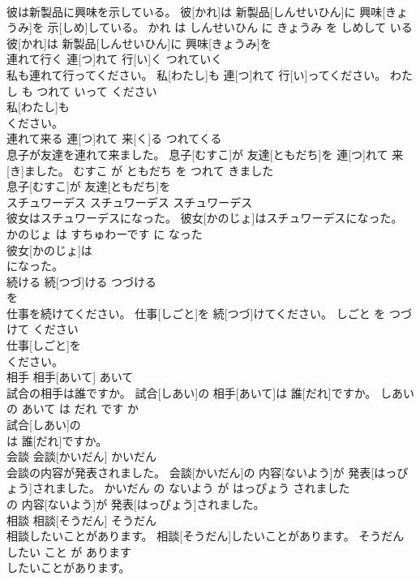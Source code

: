 \documentclass[8pt]{extreport}
\begin{document}
\begin{CJK}{UTF8}{min}
\\	彼は新製品に興味を示している。	彼[かれ]は 新製品[しんせいひん]に 興味[きょうみ]を 示[しめ]している。	かれ は しんせいひん に きょうみ を しめして いる	
\\	彼[かれ]は 新製品[しんせいひん]に 興味[きょうみ]を
\\	連れて行く	連[つ]れて 行[い]く	つれていく	
\\	私も連れて行ってください。	私[わたし]も 連[つ]れて 行[い]ってください。	わたし も つれて いって ください	
\\	私[わたし]も
\\	ください。		
\\	連れて来る	連[つ]れて 来[く]る	つれてくる	
\\	息子が友達を連れて来ました。	息子[むすこ]が 友達[ともだち]を 連[つ]れて 来[き]ました。	むすこ が ともだち を つれて きました	
\\	息子[むすこ]が 友達[ともだち]を
\\	スチュワーデス	スチュワーデス	スチュワーデス	
\\	彼女はスチュワーデスになった。	彼女[かのじょ]はスチュワーデスになった。	かのじょ は すちゅわーです に なった	
\\	彼女[かのじょ]は
\\	になった。		
\\	続ける	続[つづ]ける	つづける	
\\	を		
\\	仕事を続けてください。	仕事[しごと]を 続[つづ]けてください。	しごと を つづけて ください	
\\	仕事[しごと]を
\\	ください。		
\\	相手	相手[あいて]	あいて	
\\	試合の相手は誰ですか。	試合[しあい]の 相手[あいて]は 誰[だれ]ですか。	しあい の あいて は だれ です か	
\\	試合[しあい]の
\\	は 誰[だれ]ですか。		
\\	会談	会談[かいだん]	かいだん	
\\	会談の内容が発表されました。	会談[かいだん]の 内容[ないよう]が 発表[はっぴょう]されました。	かいだん の ないよう が はっぴょう されました	
\\	の 内容[ないよう]が 発表[はっぴょう]されました。		
\\	相談	相談[そうだん]	そうだん	
\\	相談したいことがあります。	相談[そうだん]したいことがあります。	そうだん したい こと が あります	
\\	したいことがあります。		

\end{CJK}
\end{document}

